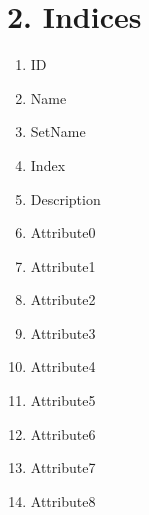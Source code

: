 \documentclass{article}
\begin{document}
\section{2. Indices}
\begin{enumerate}
    \item ID
    \item Name
    \item SetName
    \item Index
    \item Description
    \item Attribute0
    \item Attribute1
    \item Attribute2
    \item Attribute3
    \item Attribute4
    \item Attribute5
    \item Attribute6
    \item Attribute7
    \item Attribute8
\end{enumerate}
\end{document}

